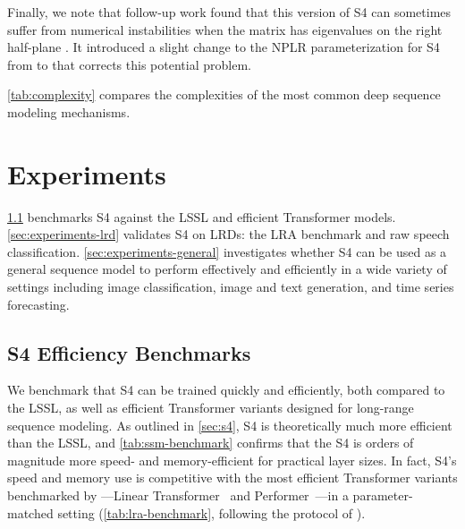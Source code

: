 \documentclass{article}
\newcommand{\methodabbrv}{S4}
\begin{document}
Finally, we note that follow-up work found that this version of S4 can sometimes suffer from numerical instabilities when the  matrix has eigenvalues on the right half-plane \citep{goel2022sashimi}.
It introduced a slight change to the NPLR parameterization for S4 from  to  that corrects this potential problem.

\cref{tab:complexity} compares the complexities of the most common deep sequence modeling mechanisms.
 
\section{Experiments}
\label{sec:experiments}

\cref{sec:experiments-benchmark} benchmarks \methodabbrv{} against the LSSL and efficient Transformer models.
\cref{sec:experiments-lrd} validates \methodabbrv{} on LRDs: the LRA benchmark and raw speech classification.
\cref{sec:experiments-general} investigates whether \methodabbrv{} can be used as a general sequence model to perform effectively and efficiently in a wide variety of settings including image classification, image and text generation, and time series forecasting.

\subsection{\methodabbrv{} Efficiency Benchmarks}
\label{sec:experiments-benchmark}
We benchmark that \methodabbrv{} can be trained quickly and efficiently, both compared to the LSSL, as well as efficient Transformer variants designed for long-range sequence modeling.
As outlined in \cref{sec:s4}, \methodabbrv{} is theoretically much more efficient than the LSSL, and \cref{tab:ssm-benchmark} confirms that the \methodabbrv{} is orders of magnitude more speed- and memory-efficient for practical layer sizes.
In fact, \methodabbrv's speed and memory use is competitive with the most efficient Transformer variants benchmarked by \citet{tay2021long}---Linear Transformer~\citep{katharopoulos2020transformers} and Performer~\citep{choromanski2020rethinking}---in a parameter-matched setting (\cref{tab:lra-benchmark}, following the protocol of \citet{tay2021long}).
\end{document}
